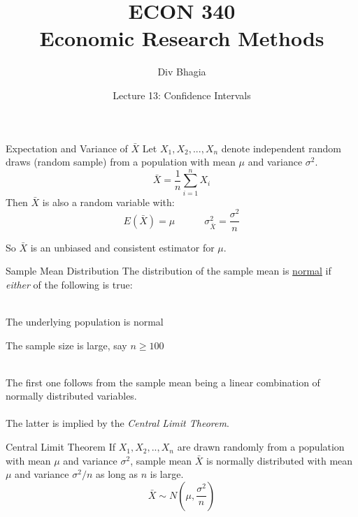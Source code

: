 \documentclass{./../div_teaching_slides}
\begin{document}
\title{ECON 340 \\ Economic Research Methods}
\author{Div Bhagia}
\date{Lecture 13: Confidence Intervals}

\begin{frame}
\maketitle
\end{frame}


\begin{frame}{Expectation and Variance of $\bar{X}$}
Let $X_1,X_2,...,X_n$ denote independent random draws (random sample) from a population with mean $\mu$ and variance $\sigma^2$. 
$$ \bar{X} = \frac{1}{n} \sum_{i=1}^n X_i $$
Then $\bar{X}$ is also a random variable with:
$$E(\bar{X}) = \mu \quad \quad \quad  \sigma^2_{\bar{X}}= \frac{\sigma^2}{n} $$ 

So $\bar{X}$ is an unbiased and consistent estimator for $\mu$.
\end{frame}

\begin{frame}{Sample Mean Distribution}
The distribution of the sample mean is \underline{normal} if \textit{either} of the following is true: \\~\\
\begin{witemize}
  \item The underlying population is normal
  \item The sample size is large, say $n\geq 100$ \\~\\
\end{witemize}
The first one follows from the sample mean being a linear combination of normally distributed variables. \\~\\

The latter is implied by the \textit{Central Limit Theorem}. 
\end{frame}

\begin{frame}{Central Limit Theorem}
\vspace{2em}
If $X_1, X_2,..,X_n$ are drawn randomly from a population with mean $\mu$ and variance $\sigma^2$, sample mean $\bar{X}$ is normally distributed with mean $\mu$ and variance $\sigma^2/n$ as long as $n$ is large.
$$\bar{X} \sim N\left(\mu, \dfrac{\sigma^2}{n}\right)$$ \\~\\
\href{https://stats-interactives.ctl.columbia.edu/central-limit-theorem}{}
\end{frame}
\end{document}
